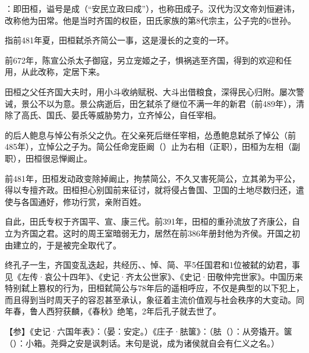 {
\item {}：即田桓，谥号是成（“安民立政曰成”），也称田成子。汉代为汉文帝刘恒避讳，改称他为田常。他是当时齐国的权臣，田氏家族的第8代宗主，公子完的6世孙。

指前481年夏，田桓弑杀齐简公一事，这是漫长的之变的一环。
\begin{lyenumerate}
\item 前672年，陈宣公杀太子御寇，另立宠姬之子，惧祸逃至齐国，得到的欢迎和任用，从此改称，定居下来。
\item 田桓之父任齐国大夫时，用小斗收纳赋税、大斗出借粮食，深得民心归附。屡次警诫，景公不以为意。景公病逝后，田乞弑杀了继位不满一年的新君（前489年），清除了高氏、国氏、晏氏等威胁势力，立齐悼公，自任宰相。
\item {}的后人鲍息与悼公有杀父之仇。在父亲死后继任宰相，怂恿鲍息弑杀了悼公（前485年），立悼公之子为。简公任命宠臣阚（）止为右相（正职），田桓为左相（副职），田桓很忌惮阚止。
\item 前481年，田桓发动政变除掉阚止，拘禁简公，不久又害死简公，立其弟为平公，得以专擅齐政。田桓担心别国前来征讨，就将侵占鲁国、卫国的土地尽数归还，遣使与各国通好，修功行赏，亲附百姓。
\item 自此，田氏专权于齐国平、宣、康三代。前391年，田桓的重孙流放了齐康公，自立为齐国之君。这时的周王室暗弱无力，居然在前386年册封他为齐侯。开国之初由建立的，于是被完全取代了。
\end{lyenumerate}
终孔子一生，齐国变乱迭起，共经历、、悼、简、平5任国君和1位被弑的幼君，事见《左传·哀公十四年》、《史记·齐太公世家》、《史记·田敬仲完世家》。中国历来特别弑上篡权的行为，田桓弑简公与78年后的遥相呼应，不仅是典型的以下犯上，而且得到当时周天子的容忍甚至承认，象征着主流价值观与社会秩序的大变动。同年春，鲁人西狩获麟，《春秋》绝笔，2年后孔子就去世了。%

【参】《史记·六国年表》：（晏：安定。）《庄子·胠箧》：（胠（）：从旁撬开。箧（）：小箱。尧舜之安是讽刺话。末句是说，成为诸侯就自会有仁义之名。）

}
